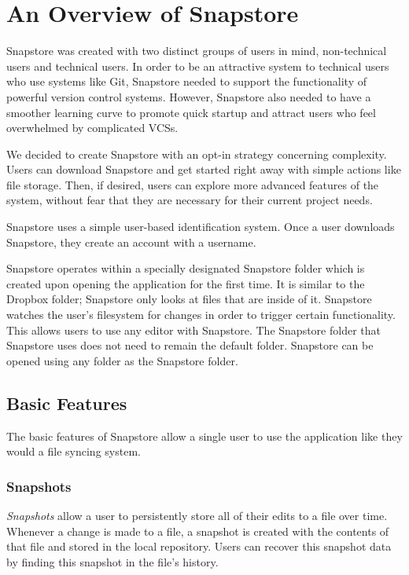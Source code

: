 \chapter{An Overview of Snapstore}

Snapstore was created with two distinct groups of users in mind, non-technical users and technical users. In order to be an attractive system to technical users who use systems like Git, Snapstore needed to support the functionality of powerful version control systems. However, Snapstore also needed to have a smoother learning curve to promote quick startup and attract users who feel overwhelmed by complicated VCSs. 

We decided to create Snapstore with an opt-in strategy concerning complexity. Users can download Snapstore and get started right away with simple actions like file storage. Then, if desired, users can explore more advanced features of the system, without fear that they are necessary for their current project needs.

Snapstore uses a simple user-based identification system. Once a user downloads Snapstore, they create an account with a username.

Snapstore operates within a specially designated Snapstore folder which is created upon opening the application for the first time. It is similar to the Dropbox folder; Snapstore only looks at files that are inside of it. Snapstore watches the user's filesystem for changes in order to trigger certain functionality. This allows users to use any editor with Snapstore. The Snapstore folder that Snapstore uses does not need to remain the default folder. Snapstore can be opened using any folder as the Snapstore folder.

\section{Basic Features}

The basic features of Snapstore allow a single user to use the application like they would a file syncing system.

\subsection{Snapshots}

\textit{Snapshots} allow a user to persistently store all of their edits to a file over time. Whenever a change is made to a file, a snapshot is created with the contents of that file and stored in the local repository. Users can recover this snapshot data by finding this snapshot in the file's history.

